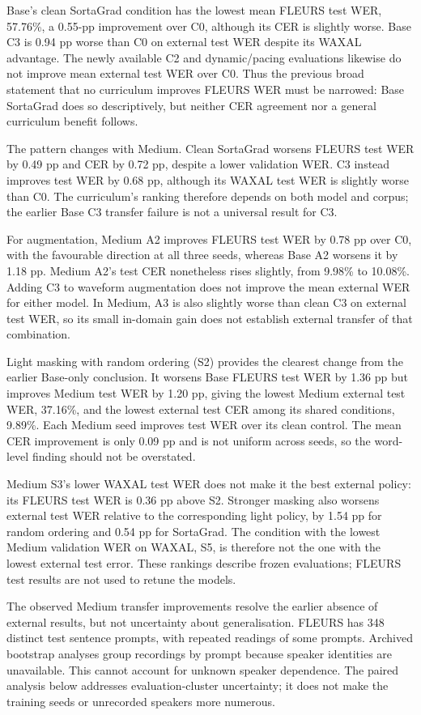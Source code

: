 \documentclass[12pt,a4paper]{report}
\begin{document}
Base's clean SortaGrad condition has the lowest mean FLEURS test WER,
57.76\%, a 0.55-pp improvement over C0, although its CER is slightly worse.
Base C3 is 0.94 pp worse than C0 on external test WER despite its WAXAL
advantage. The newly available C2 and dynamic/pacing evaluations likewise
do not improve mean external test WER over C0. Thus the previous broad
statement that no curriculum improves FLEURS WER must be narrowed: Base
SortaGrad does so descriptively, but neither CER agreement nor a general
curriculum benefit follows.

The pattern changes with Medium. Clean SortaGrad worsens FLEURS test WER
by 0.49 pp and CER by 0.72 pp, despite a lower validation WER. C3 instead
improves test WER by 0.68 pp, although its WAXAL test WER is slightly worse
than C0. The curriculum's ranking therefore depends on both model and corpus;
the earlier Base C3 transfer failure is not a universal result for C3.

For augmentation, Medium A2 improves FLEURS test WER by 0.78 pp over C0,
with the favourable direction at all three seeds, whereas Base A2 worsens
it by 1.18 pp. Medium A2's test CER nonetheless rises slightly, from 9.98\%
to 10.08\%. Adding C3 to waveform augmentation does not improve the mean
external WER for either model. In Medium, A3 is also slightly worse than
clean C3 on external test WER, so its small in-domain gain does not establish
external transfer of that combination.

Light masking with random ordering (S2) provides the clearest change from
the earlier Base-only conclusion. It worsens Base FLEURS test WER by
1.36 pp but improves Medium test WER by 1.20 pp, giving the lowest Medium
external test WER, 37.16\%, and the lowest external test CER among its
shared conditions, 9.89\%. Each Medium seed improves test WER over its
clean control. The mean CER improvement is only 0.09 pp and is not uniform
across seeds, so the word-level finding should not be overstated.

Medium S3's lower WAXAL test WER does not make it the best external policy:
its FLEURS test WER is 0.36 pp above S2. Stronger masking also worsens
external test WER relative to the corresponding light policy, by 1.54 pp
for random ordering and 0.54 pp for SortaGrad. The condition with the lowest
Medium validation WER on WAXAL, S5, is therefore not the one with the
lowest external test error. These rankings describe frozen evaluations;
FLEURS test results are not used to retune the models.

The observed Medium transfer improvements resolve the earlier absence of
external results, but not uncertainty about generalisation. FLEURS has 348
distinct test sentence prompts, with repeated readings of some prompts.
Archived bootstrap analyses group recordings by prompt because speaker
identities are unavailable. This cannot account for unknown speaker dependence.
The paired analysis below addresses evaluation-cluster uncertainty; it does
not make the training seeds or unrecorded speakers more numerous.
\end{document}

